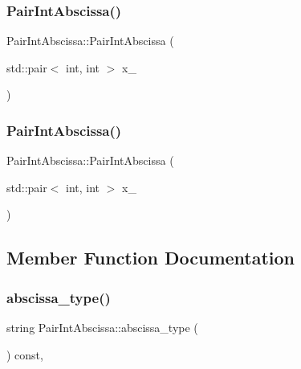 \subsubsection{\texorpdfstring{PairIntAbscissa()}{PairIntAbscissa()}\hspace{0.1cm}{\footnotesize\ttfamily [1/2]}}
{\footnotesize\ttfamily Pair\+Int\+Abscissa\+::\+Pair\+Int\+Abscissa (\begin{DoxyParamCaption}\item[{std\+::pair$<$ int, int $>$}]{x\+\_\+ }\end{DoxyParamCaption})\hspace{0.3cm}{\ttfamily [inline]}}

\mbox{\label{classPairIntAbscissa_ad3882c6aa7d5b525db54c0f1859c0cd6}} 
\subsubsection{\texorpdfstring{PairIntAbscissa()}{PairIntAbscissa()}\hspace{0.1cm}{\footnotesize\ttfamily [2/2]}}
{\footnotesize\ttfamily Pair\+Int\+Abscissa\+::\+Pair\+Int\+Abscissa (\begin{DoxyParamCaption}\item[{std\+::pair$<$ int, int $>$}]{x\+\_\+ }\end{DoxyParamCaption})\hspace{0.3cm}{\ttfamily [inline]}}



\subsection{Member Function Documentation}
\mbox{\label{classPairIntAbscissa_a7b186cfb2c2d44289b12f0ade56ea948}} 
\subsubsection{\texorpdfstring{abscissa\_type()}{abscissa\_type()}\hspace{0.1cm}{\footnotesize\ttfamily [1/2]}}
{\footnotesize\ttfamily string Pair\+Int\+Abscissa\+::abscissa\+\_\+type (\begin{DoxyParamCaption}{ }\end{DoxyParamCaption}) const\hspace{0.3cm}{\ttfamily [inline]}, {\ttfamily [virtual]}}



